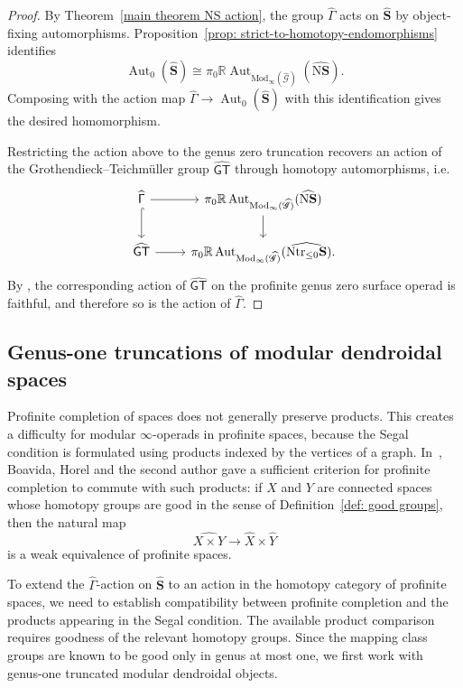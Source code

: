 \documentclass{amsart}
\newcommand{\bS}{\mathbf{S}}
\newcommand{\Grpd}{\mathscr{G}}
\newcommand{\Mod}{\mathrm{Mod}}
\newcommand{\nerve}{\mathrm{N}}
\newcommand{\Aut}{\operatorname{Aut}}
\newcommand{\trun}[1]{\mathrm{tr}_{\leq{#1}}}
\newcommand{\GT}{\widehat{\mathsf{GT}}}
\newcommand{\NS}{\widehat{\mathsf{\Gamma}}}
\theoremstyle{definition}
\numberwithin{equation}{section}
\begin{document}
\begin{proof}
By Theorem~\ref{main theorem NS action}, the group $\NS$ acts on $\widehat{\bS}$ by object-fixing automorphisms. Proposition~\ref{prop: strict-to-homotopy-endomorphisms} identifies
\[
\Aut_0(\widehat{\bS})\cong \pi_0\mathbb R\Aut_{\Mod_{\infty}(\widehat{\Grpd})}
(\widehat{\nerve\bS}).
\]
Composing with the action map $\NS\longrightarrow \Aut_0(\widehat{\bS})$ with this identification gives the desired homomorphism.

Restricting the action above to the genus zero truncation recovers an action of the Grothendieck--Teichmüller group $\GT$ through homotopy automorphisms, i.e.  
    \[\begin{tikzcd}
    	{\NS } & {\pi_0\mathbb R\Aut_{\Mod_{\infty}(\widehat{\Grpd})} (\widehat{\nerve\bS})} \\
    	\GT & {\pi_0\mathbb R\Aut_{\Mod_{\infty}(\widehat{\Grpd})} (\widehat{\nerve\trun{0}{\bS}}).}
    	\arrow[from=1-1, to=1-2]
    	\arrow[hook, from=1-1, to=2-1]
    	\arrow[from=1-2, to=2-2]
    	\arrow[from=2-1, to=2-2]
    \end{tikzcd}\]
By \cite[Theorem 8.4]{Boavida-Horel-Robertson}, the corresponding action of $\GT$ on the profinite genus zero surface operad is faithful, and therefore so is the action of $\NS$.
\end{proof}




\subsection{Genus-one truncations of modular dendroidal spaces}
Profinite completion of spaces does not generally preserve products. This creates a difficulty for modular $\infty$-operads in profinite spaces, because the Segal condition is formulated using products indexed by the vertices of a graph. In~\cite[Proposition~3.9]{Boavida-Horel-Robertson}, Boavida, Horel and the second author gave a sufficient criterion for profinite completion to commute with such products: if $X$ and $Y$ are connected spaces whose homotopy groups are good in the sense of Definition~\ref{def: good groups}, then the natural map
\[
\widehat{X\times Y}\longrightarrow \widehat{X}\times \widehat{Y}
\]
is a weak equivalence of profinite spaces.

To extend the $\NS$-action on $\widehat{\bS}$ to an action in the homotopy category of profinite spaces, we need to establish compatibility between profinite completion and the products appearing in the Segal condition. The available product comparison requires goodness of the relevant homotopy groups. Since the mapping class groups are known to be good only in genus at most one, we first work with genus-one truncated modular dendroidal objects.
\end{document}
